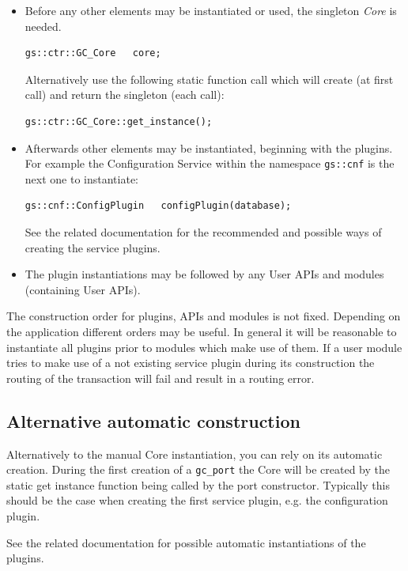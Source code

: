 \begin{itemize}

  \item Before any other \GreenControl elements may be instantiated or used, the singleton \emph{Core} is needed.
\begin{lstlisting}
gs::ctr::GC_Core   core;
\end{lstlisting}
Alternatively use the following static function call which will create (at first call) and return the singleton (each call):
\begin{lstlisting}
gs::ctr::GC_Core::get_instance();
\end{lstlisting}

  \item Afterwards other \GreenControl elements may be instantiated, beginning with the plugins. For example the Configuration Service within the namespace \lstinline|gs::cnf| is the next one to instantiate:
\begin{lstlisting}
gs::cnf::ConfigPlugin   configPlugin(database);
\end{lstlisting}
See the related documentation for the recommended and possible ways of creating the service plugins.

  \item The plugin instantiations may be followed by any User APIs and modules (containing User APIs). 
\end{itemize}

The construction order for plugins, APIs and modules is not fixed. Depending on the application different orders may be useful. In general it will be reasonable to instantiate all plugins prior to modules which make use of them. If a user module tries to make use of a not existing service plugin during its construction the routing of the transaction will fail and result in a routing error.

\subsection{Alternative automatic construction}
Alternatively to the manual Core instantiation, you can rely on its automatic creation. During the first creation of a \lstinline|gc_port| the Core will be created by the static get instance function being called by the port constructor. Typically this should be the case when creating the first service plugin, e.g. the configuration plugin.

See the related documentation for possible automatic instantiations of the plugins.

